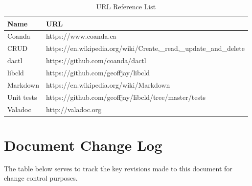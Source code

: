 \documentclass[11pt]{article}
\begin{document}
    \begin{table}[H]
      \centering
      \begin{tabular}{l p{10cm}}
        \toprule
        Name & URL \\ [0.5ex]
        \midrule
        Coanda     & https://www.coanda.ca \\
        CRUD       & https://en.wikipedia.org/wiki/Create,\_read,\_update\_and\_delete \\
        dactl      & https://github.com/coanda/dactl \\
        libcld     & https://github.com/geoffjay/libcld \\
        Markdown   & https://en.wikipedia.org/wiki/Markdown \\
        Unit tests & https://github.com/geoffjay/libcld/tree/master/tests \\
        Valadoc    & http://valadoc.org \\
        \bottomrule
      \end{tabular}
      \caption{URL Reference List}\label{tab:websites}
    \end{table}

  \newpage

  \section{Document Change Log}\label{app:changelog}

		The table below serves to track the key revisions made to this document for
 		change control purposes.

		\begin{versionhistory}
		\end{versionhistory}
\end{document}
